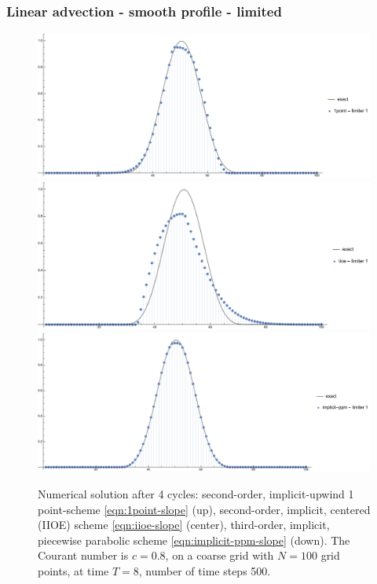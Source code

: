 \documentclass[../thesis.tex]{subfiles}
\begin{document}
\subsubsection{Linear advection - smooth profile - limited}
\begin{figure}[H]
	\centering
	\includegraphics[width=\textwidth]{fig-1point-c0p8-T8-limit1-smooth.pdf}
	\includegraphics[width=\textwidth]{fig-iioe-c0p8-T8-limit1-smooth.pdf}
	\includegraphics[width=\textwidth]{fig-implicit-ppm-c0p8-T8-limit1-smooth.pdf}
	\caption{Numerical solution after 4 cycles: second-order, implicit-upwind 1 point-scheme \eqref{eqn:1point-slope} (up), second-order, implicit, centered (IIOE) scheme \eqref{eqn:iioe-slope} (center), third-order, implicit, piecewise parabolic scheme \eqref{eqn:implicit-ppm-slope} (down). The Courant number is \(c = 0.8\), on a coarse grid with \(N = 100\) grid points, at time \(T = 8\), number of time steps 500.}
	\label{fig:c0p8-T8-limit1-smooth}
\end{figure}
\end{document}

